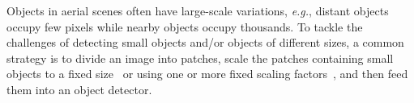 \documentclass[letterpaper]{article} %
\def \eg {\emph{e.g.}}
\def \etal {\emph{et al. }}
\newcommand\rjf[1]{\textcolor{red}{\{RJF: #1\}}}
\begin{document}

Objects in aerial scenes often have large-scale variations, \eg, %
distant objects occupy few pixels while nearby objects occupy thousands. %
To tackle the challenges of detecting small objects and/or objects of different sizes, a common strategy is to divide an image into patches, scale the patches containing small objects to a fixed size~\cite{Deng_2021_GLSAN, Xu_2022_AdaZoom} or using one or more fixed scaling factors~\cite{Huang_2022_UFPMP}, and then feed them into an object detector.
\end{document}
